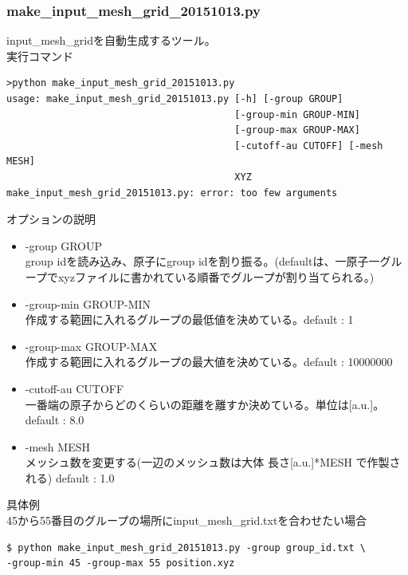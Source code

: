 \documentclass{jsarticle}
\begin{document}
\subsubsection{make\_input\_mesh\_grid\_20151013.py}
input\_mesh\_gridを自動生成するツール。\\

実行コマンド
\begin{Verbatim}[frame=single]
>python make_input_mesh_grid_20151013.py
usage: make_input_mesh_grid_20151013.py [-h] [-group GROUP]
                                        [-group-min GROUP-MIN]
                                        [-group-max GROUP-MAX]
                                        [-cutoff-au CUTOFF] [-mesh MESH]
                                        XYZ
make_input_mesh_grid_20151013.py: error: too few arguments
\end{Verbatim}

オプションの説明
\begin{itemize}
\item -group GROUP\\
group idを読み込み、原子にgroup idを割り振る。(defaultは、一原子一グループでxyzファイルに書かれている順番でグループが割り当てられる。)
\item -group-min GROUP-MIN\\
作成する範囲に入れるグループの最低値を決めている。default : 1
\item -group-max GROUP-MAX\\
作成する範囲に入れるグループの最大値を決めている。default : 10000000
\item -cutoff-au CUTOFF\\
一番端の原子からどのくらいの距離を離すか決めている。単位は[a.u.]。default : 8.0
\item -mesh MESH\\
メッシュ数を変更する(一辺のメッシュ数は大体 長さ[a.u.]*MESH で作製される) default : 1.0\\
\end{itemize}

具体例\\
45から55番目のグループの場所にinput\_mesh\_grid.txtを合わせたい場合
\begin{Verbatim}[frame=single]
$ python make_input_mesh_grid_20151013.py -group group_id.txt \
-group-min 45 -group-max 55 position.xyz
\end{Verbatim}
\end{document}
